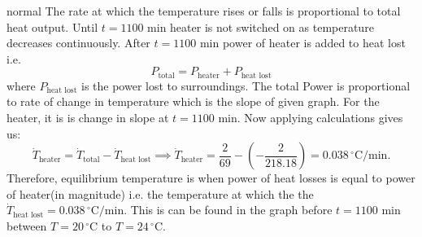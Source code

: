\begin{solution}{normal}
The rate at which the temperature rises or falls is proportional to total heat output. Until $t = 1100$ min heater is not switched on as temperature decreases continuously. After $t = 1100$ min power of heater is added to heat lost i.e. 
\[P_{\text{total}} = P_{\text{heater}} + P_{\text{heat lost}}\]
where $P_{\text{heat lost}}$ is the power lost to surroundings. The total Power is proportional to rate of change in temperature which is the slope of given graph. For the heater, it is is change in slope at $t = 1100$ min. Now applying calculations gives us:
\[\dot{T}_{\text{heater}} = \dot{T}_{\text{total}} - \dot{T}_{\text{heat lost}} \implies \dot{T}_{\text{heater}} = \frac{2}{69}-\left(-\frac{2}{218.18}\right)= 0.038\,^{\circ}\text{C/min}.\]
Therefore, equilibrium temperature is when power of heat losses is equal to power of heater(in magnitude) i.e. the temperature at which the the $\dot{T}_{\text{heat lost}} = 0.038\,^{\circ}\text{C/min}$. This is can be found in the graph before $t = 1100$ min between $ T = 20\,^{\circ}\text{C}$ to $T = 24\,^{\circ}\text{C}$.

\end{solution}
